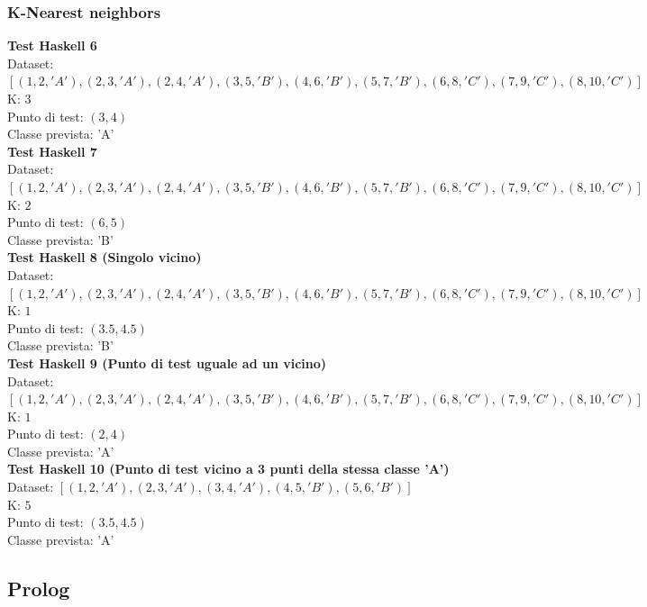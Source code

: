 \documentclass[11pt]{article}
\theoremstyle{definition}
\begin{document}
\subsubsection{K-Nearest neighbors}
\textbf{Test Haskell 6}\\
Dataset: $[(1, 2, 'A'), (2, 3, 'A'), (2, 4, 'A'), (3, 5, 'B'), (4, 6, 'B'), (5, 7, 'B'), (6, 8, 'C'), (7, 9, 'C'), (8, 10, 'C')]$\\
K: $3$\\
Punto di test: $(3, 4)$\\
Classe prevista: 'A'\\
\newline
\textbf{Test Haskell 7}\\
Dataset: $[(1, 2, 'A'), (2, 3, 'A'), (2, 4, 'A'), (3, 5, 'B'), (4, 6, 'B'), (5, 7, 'B'), (6, 8, 'C'), (7, 9, 'C'), (8, 10, 'C')]$\\
K: $2$\\
Punto di test: $(6, 5)$\\
Classe prevista: 'B'\\
\newline
\textbf{Test Haskell 8 (Singolo vicino)}\\
Dataset: $[(1, 2, 'A'), (2, 3, 'A'), (2, 4, 'A'), (3, 5, 'B'), (4, 6, 'B'), (5, 7, 'B'), (6, 8, 'C'), (7, 9, 'C'), (8, 10, 'C')]$\\
K: $1$\\
Punto di test: $(3.5, 4.5)$\\
Classe prevista: 'B'\\
\newline
\textbf{Test Haskell 9 (Punto di test uguale ad un vicino)}\\
Dataset: $[(1, 2, 'A'), (2, 3, 'A'), (2, 4, 'A'), (3, 5, 'B'), (4, 6, 'B'), (5, 7, 'B'), (6, 8, 'C'), (7, 9, 'C'), (8, 10, 'C')]$\\
K: $1$\\
Punto di test: $(2, 4)$\\
Classe prevista: 'A'\\
\newline
\textbf{Test Haskell 10 (Punto di test vicino a 3 punti della stessa classe 'A')}\\
Dataset: $[(1, 2, 'A'), (2, 3, 'A'), (3, 4, 'A'), (4, 5, 'B'), (5, 6, 'B')]$\\
K: $5$\\
Punto di test: $(3.5, 4.5)$\\
Classe prevista: 'A'

\subsection{Prolog}
\end{document}

